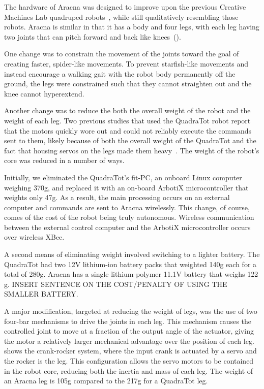 \documentclass[letterpaper]{article}
\begin{document}
The hardware of Aracna was designed to improve upon the previous Creative Machines Lab
quadruped robots~\citep{bongard2006resilient, yosinski2011gaits}, while still qualitatively resembling those robots. Aracna is similar in that it has a body and four legs, with each leg having two joints that can pitch forward and back like knees~(). 

One change was to constrain the movement of the
joints toward the goal of creating faster, spider-like movements. To
prevent starfish-like movements and instead encourage a walking gait with the robot body permanently off the ground, the legs were constrained such that they cannot straighten out and the knee cannot hyperextend. 

Another change was to reduce the both the overall weight of the robot and the weight of each leg. Two previous studies that used the QuadraTot robot report that the motors quickly wore out and could not reliably execute the commands sent to them, likely because of both the overall weight of the QuadraTot and the fact that housing servos on the legs made them heavy~\citep{bongard2006resilient, yosinski2011gaits}. The weight of the robot's core was reduced in a number of ways. 

Initially, we eliminated the QuadraTot's fit-PC, an onboard Linux computer weighing 370g, and replaced it with an on-board ArbotiX microcontroller that weights only 47g. As a result, the main processing occurs on an external computer and commands are sent to Aracna wirelessly. This change, of course, comes of the cost of the robot being truly autonomous. Wireless communication between the external control computer
and the ArbotiX  microcontroller occurs over wireless XBee.

A second means of eliminating weight involved switching to a lighter battery. The QuadraTot had two 12V lithium-ion battery packs that weighted 140g each for a total of 280g. Aracna has a single lithium-polymer 11.1V battery that weighs 122 g. INSERT SENTENCE ON THE COST/PENALTY OF USING THE SMALLER BATTERY.   

A major modification, targeted at reducing the weight of legs, was the use of two four-bar mechanisms to drive the joints in each
leg. This mechanism causes the controlled joint to move at a fraction
of the output angle of the actuator, giving the motor a relatively
larger mechanical advantage over the position of each leg.
 shows the crank-rocker system, where the input crank
is actuated by a servo and the rocker is the leg. This
configuration allows the servo motors to be contained in the robot core, reducing both the inertia and mass of each leg. The weight of an Aracna leg is 105g compared to the 217g for a QuadraTot leg.  
\end{document}
